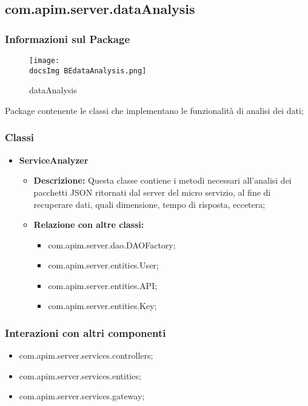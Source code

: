 {{      \subsection{com.apim.server.dataAnalysis}{
  \subsubsection{Informazioni sul Package}
    \begin{figure}[H]
      \centering
      \texttt{[image: \\docsImg BEdataAnalysis.png]}
      \caption{dataAnalysis}
      \label{dataAnalysis}
    \end{figure}
    Package  contenente le classi che implementano le funzionalità di analisi dei dati;
    \subsubsection{Classi}
    \begin{itemize} \itemsep1pt
    \item \textbf{ServiceAnalyzer}
    \begin{itemize}
    \item \textbf{Descrizione:} Questa classe contiene i metodi necessari all'analisi dei pacchetti JSON ritornati dal server del micro servizio, al fine di recuperare dati, quali dimensione, tempo di risposta, eccetera;
    \item \textbf{Relazione con altre classi:}
    \begin{itemize}
    \item com.apim.server.dao.DAOFactory;
    \item com.apim.server.entities.User;
    \item com.apim.server.entities.API;
    \item com.apim.server.entities.Key;
    \end{itemize}
    \end{itemize}
    \end{itemize}
    \subsubsection{Interazioni con altri componenti}
    \begin{itemize}
    \item com.apim.server.services.controllers;
    \item com.apim.server.services.entities;
    \item com.apim.server.services.gateway;
    \end{itemize}
  }
}}
